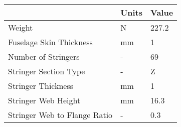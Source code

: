 \begin{tabular}{lll}
& Units & Value \\ 
\hline 
Weight & N & 227.2 \\ 
Fuselage Skin Thickness & mm & 1 \\ 
Number of Stringers & - & 69 \\ 
Stringer Section Type & - & Z \\ 
Stringer Thickness & mm & 1 \\ 
Stringer Web Height & mm & 16.3 \\ 
Stringer Web to Flange Ratio & - & 0.3 \\ 
\hline 
\end{tabular}